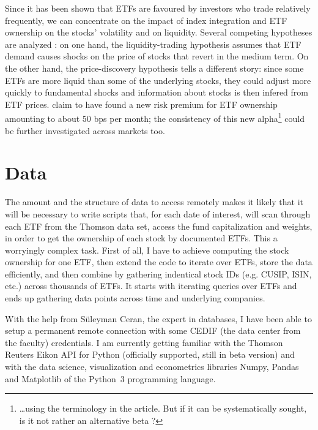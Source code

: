 \documentclass[a4paper, twoside, listof=totoc, toc=sectionentrywithdots]{scrartcl}
\begin{document}
Since it has been shown that ETFs are favoured by investors who trade relatively frequently, we can concentrate on the impact of index integration and ETF ownership on the stocks' volatility and on liquidity. Several competing hypotheses are analyzed : on one hand, the liquidity-trading hypothesis assumes that ETF demand causes shocks on the price of stocks that revert in the medium term. On the other hand, the price-discovery hypothesis tells a different story: since some ETFs are more liquid than some of the underlying stocks, they could adjust more quickly to fundamental shocks and information about stocks is then infered from ETF prices. \cite{Ben-David2018} claim to have found a new risk premium for ETF ownership amounting to about 50 bps per month; the consistency of this new alpha\footnote{\dots using the terminology in the article. But if it can be systematically sought, is it not rather an alternative beta ?} could be further investigated across markets too.

\section{Data}
The amount and the structure of data to access remotely makes it likely that it will be necessary to write scripts that, for each date of interest, will scan through each ETF from the Thomson data set, access the fund capitalization and weights, in order to get the ownership of each stock by documented ETFs. This a worryingly complex task. First of all, I have to achieve computing the stock ownership for one ETF, then extend the code to iterate over ETFs, store the data efficiently, and then combine by gathering indentical stock IDs (e.g. CUSIP, ISIN, etc.) across thousands of ETFs. It starts with iterating queries over ETFs and ends up gathering data points across time and underlying companies.

With the help from Süleyman Ceran, the expert in databases, I have been able to setup a permanent remote connection with some CEDIF (the data center from the faculty) credentials. I am currently getting familiar with the Thomson Reuters Eikon API for Python (officially supported, still in beta version) and with the data science, visualization and  econometrics libraries \textsf{Numpy}, \textsf{Pandas} and \textsf{Matplotlib} of the Python~3 programming language.  
\end{document}
